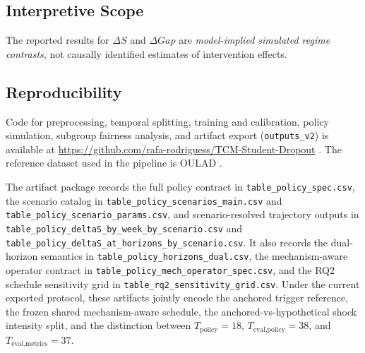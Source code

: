 \subsection{Interpretive Scope}

The reported results for $\Delta S$ and $\Delta Gap$ are \textit{model-implied simulated regime contrasts}, not causally identified estimates of intervention effects.

\subsection{Reproducibility}

Code for preprocessing, temporal splitting, training and calibration, policy simulation, subgroup fairness analysis, and artifact export (\texttt{outputs\_v2}) is available at
\url{https://github.com/rafa-rodriguess/TCM-Student-Dropout}
\cite{RafaRepoTCMStudentDropout}. The reference dataset used in the pipeline is OULAD \cite{Kuzilek2017OULAD}.

The artifact package records the full policy
contract in \nolinkurl{table_policy_spec.csv}, the scenario catalog in
\nolinkurl{table_policy_scenarios_main.csv} and
\nolinkurl{table_policy_scenario_params.csv}, and scenario-resolved trajectory
outputs in \nolinkurl{table_policy_deltaS_by_week_by_scenario.csv} and
\nolinkurl{table_policy_deltaS_at_horizons_by_scenario.csv}. It also records
the dual-horizon semantics in \nolinkurl{table_policy_horizons_dual.csv}, the mechanism-aware operator contract in \nolinkurl{table_policy_mech_operator_spec.csv}, and the RQ2 schedule sensitivity grid in \nolinkurl{table_rq2_sensitivity_grid.csv}. Under the current exported protocol, these artifacts jointly encode the
anchored trigger reference, the frozen shared mechanism-aware schedule, the
anchored-vs-hypothetical shock intensity split, and the distinction between
$T_{\text{policy}}=18$, $T_{\text{eval,policy}}=38$, and
$T_{\text{eval,metrics}}=37$.